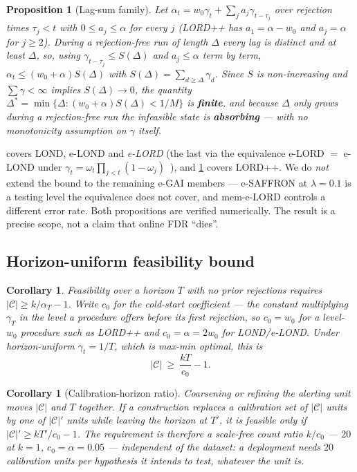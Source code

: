 \documentclass[conference]{IEEEtran}
\newtheorem{proposition}[theorem]{Proposition}
\newtheorem{corollary}[theorem]{Corollary}
\newcommand{\Cal}{\mathcal{C}}
\newcommand{\nCal}{\lvert\Cal\rvert}
\newcommand{\ceil}{M}
\newcommand{\alphat}{\alpha_t}
\begin{document}
\begin{proposition}[Lag-sum family]\label{thm:family2}
Let $\alphat = w_0\gamma_t + \sum_j a_j \gamma_{t-\tau_j}$ over rejection times $\tau_j < t$
with $0 \le a_j \le \alpha$ for every $j$ (LORD++ has $a_1 = \alpha-w_0$ and $a_j = \alpha$ for
$j\ge2$). During a rejection-free run of length $\Delta$ every lag is
distinct and at least $\Delta$, so, using $\gamma_{t-\tau_j} \le S(\Delta)$ and $a_j \le \alpha$
term by term, $\alphat \le (w_0+\alpha)S(\Delta)$ with
$S(\Delta) = \sum_{d \ge \Delta}\gamma_d$. Since $S$ is non-increasing and
$\sum\gamma < \infty$ implies $S(\Delta) \to 0$, the quantity
$\Delta^{*} = \min\{\Delta : (w_0+\alpha)S(\Delta) < 1/\ceil\}$ is \textbf{finite}, and
because $\Delta$ only grows during a rejection-free run the infeasible state is
\textbf{absorbing} --- with no monotonicity assumption on $\gamma$ itself.
\end{proposition}

 covers LOND, e-LOND and \emph{e-LORD} (the last via the equivalence
e-LORD $=$ e-LOND under $\gamma_t = \omega_t\prod_{j<t}(1-\omega_j)$~\cite{egai2025}), and
\cref{thm:family2} covers LORD++. We do \emph{not} extend the bound to the remaining e-GAI members ---
e-SAFFRON at $\lambda=0.1$ is a testing level the equivalence does not cover, and mem-e-LORD controls a
different error rate. Both propositions are verified numerically. The result is a precise scope, not a
claim that online FDR ``dies''.

\subsection{Horizon-uniform feasibility bound}

\begin{corollary}\label{cor:budget}
Feasibility over a horizon $T$ with no prior rejections requires $\nCal \ge k/\alpha_T - 1$. Write
$c_0$ for the \emph{cold-start coefficient} --- the constant multiplying $\gamma_T$ in the level a
procedure offers before its first rejection, so $c_0 = w_0$ for a level-$w_0$ procedure such as
LORD++ and $c_0 = \alpha = 2w_0$ for LOND/e-LOND. Under horizon-uniform $\gamma_t = 1/T$, which is
max-min optimal, this is
\[
\nCal \ \ge\ \frac{kT}{c_0} - 1.
\]
\end{corollary}

\begin{corollary}[Calibration-horizon ratio]\label{cor:calhorizon}
Coarsening or refining the alerting unit moves $\nCal$ and $T$ together. If a construction replaces a
calibration set of $\nCal$ units by one of $\nCal'$ units while leaving the horizon at $T'$, it is
feasible only if $\nCal' \ge kT'/c_0 - 1$. The requirement is therefore a \emph{scale-free count
ratio} $k/c_0$ --- $20$ at $k=1$, $c_0 = \alpha = 0.05$ --- independent of the dataset: a deployment
needs $20$ calibration units per hypothesis it intends to test, whatever the unit is.
\end{corollary}
\end{document}
